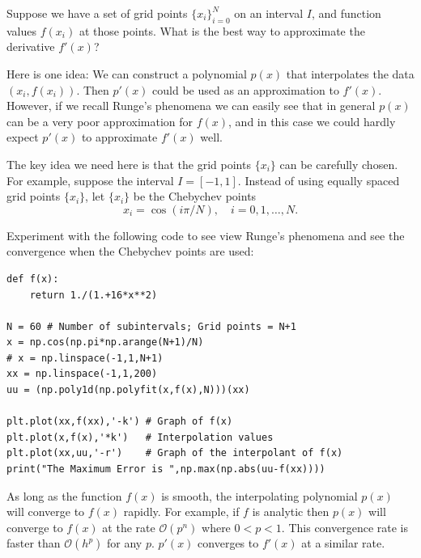 \label{lab:pseudospectral1}

Suppose we have a set of grid points $\{x_i\}_{i=0}^N$ on an interval $I$, and function values $f(x_i)$ at those points. What is the best way to approximate the derivative $f'(x)$?

Here is one idea: We can construct a polynomial $p(x)$ that interpolates the data $(x_i,f(x_i))$. Then $p'(x)$ could be used as an approximation to $f'(x)$. However, if we recall Runge's phenomena we can easily see that in general $p(x)$ can be a very poor approximation for $f(x)$, and in this case we could hardly expect $p'(x)$ to approximate $f'(x)$ well. 

The key idea we need here is that the grid points $\{x_i\}$ can be carefully chosen. For example, suppose the interval $I = [-1,1]$. Instead of using equally spaced grid points $\{x_i\}$, let $\{x_i\}$ be the Chebychev points 
\[x_i = \cos (i \pi /N), \quad i = 0, 1, \ldots, N.\]

Experiment with the following code to see view Runge's phenomena and see the convergence when the Chebychev points are used: 
\begin{lstlisting}
def f(x): 
    return 1./(1.+16*x**2) 

N = 60 # Number of subintervals; Grid points = N+1
x = np.cos(np.pi*np.arange(N+1)/N)
# x = np.linspace(-1,1,N+1)
xx = np.linspace(-1,1,200)
uu = (np.poly1d(np.polyfit(x,f(x),N)))(xx)

plt.plot(xx,f(xx),'-k') # Graph of f(x)
plt.plot(x,f(x),'*k')   # Interpolation values 
plt.plot(xx,uu,'-r')    # Graph of the interpolant of f(x)
print("The Maximum Error is ",np.max(np.abs(uu-f(xx))))
\end{lstlisting}

As long as the function $f(x)$ is smooth, the interpolating polynomial $p(x)$ will converge to $f(x)$ rapidly. For example, if $f$ is analytic then $p(x)$ will converge to $f(x)$ at the rate $\mathcal{O}(p^n)$ where $0<p<1$. This convergence rate is faster than $\mathcal{O}(h^p)$ for any $p$. $p'(x)$ converges to $f'(x)$ at a similar rate. 



